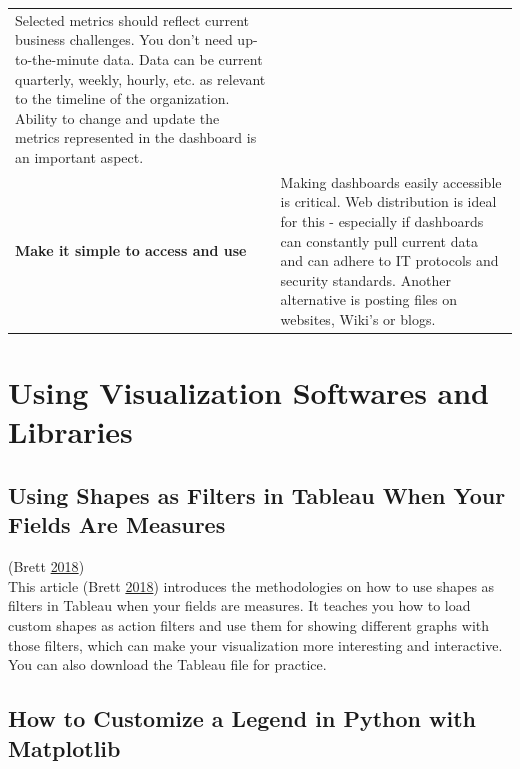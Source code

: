 \documentclass[]{book}
\begin{document}
\begin{longtable}[]{@{}ll@{}}
\begin{minipage}[t]{0.77\columnwidth}
Selected metrics should reflect current business challenges. You don't need up-to-the-minute data. Data can be current quarterly, weekly, hourly, etc. as relevant to the timeline of the organization. Ability to change and update the metrics represented in the dashboard is an important aspect.\strut
\end{minipage}\tabularnewline
\begin{minipage}[t]{0.17\columnwidth}\raggedright
\textbf{Make it simple to access and use}\strut
\end{minipage} & \begin{minipage}[t]{0.77\columnwidth}\raggedright
Making dashboards easily accessible is critical. Web distribution is ideal for this - especially if dashboards can constantly pull current data and can adhere to IT protocols and security standards. Another alternative is posting files on websites, Wiki's or blogs.\strut
\end{minipage}\tabularnewline
\bottomrule
\end{longtable}

\hypertarget{using-visualization-softwares-and-libraries}{%
\section{Using Visualization Softwares and Libraries}\label{using-visualization-softwares-and-libraries}}

\hypertarget{using-shapes-as-filters-in-tableau-when-your-fields-are-measures}{%
\subsection{Using Shapes as Filters in Tableau When Your Fields Are Measures}\label{using-shapes-as-filters-in-tableau-when-your-fields-are-measures}}

(Brett \protect\hyperlink{ref-measures}{2018})\\
This article (Brett \protect\hyperlink{ref-measures}{2018}) introduces the methodologies on how to use shapes as filters in Tableau when your fields are measures. It teaches you how to load custom shapes as action filters and use them for showing different graphs with those filters, which can make your visualization more interesting and interactive. You can also download the Tableau file for practice.

\hypertarget{how-to-customize-a-legend-in-python-with-matplotlib}{%
\subsection{How to Customize a Legend in Python with Matplotlib}\label{how-to-customize-a-legend-in-python-with-matplotlib}}
\end{document}
